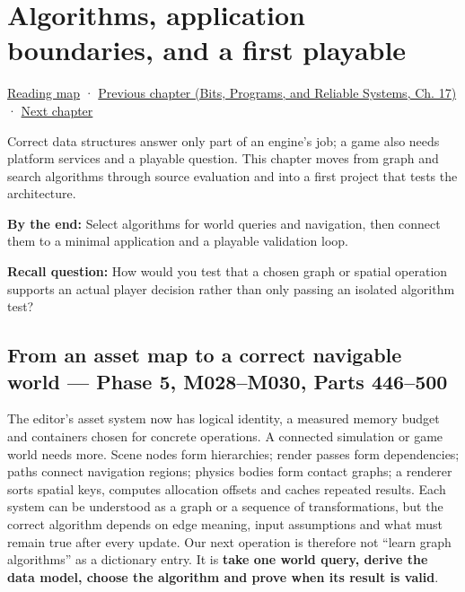 \chapter{Algorithms, application boundaries, and a first playable}\label{05-engine-i-ch008-algorithms-application-boundaries-and-a-first-playable}\hypertarget{05-engine-i-ch008}{}\label{stagechapter:05-engine-i-ch008}

\hyperref[volume-reading-map]{Reading map} · \href{../01-Bits-Programs-and-Reliable-Systems/main.pdf\#nameddest=05-engine-i-ch007-typed-apis-and-measured-cpu-data-structures}{Previous chapter (Bits, Programs, and Reliable Systems, Ch. 17)} · \hyperref[05-engine-i-ch009-player-choices-rules-and-readable-feedback]{Next chapter}

Correct data structures answer only part of an engine's job; a game also needs platform services and a playable question. This chapter moves from graph and search algorithms through source evaluation and into a first project that tests the architecture.

\textbf{By the end:} Select algorithms for world queries and navigation, then connect them to a minimal application and a playable validation loop.

\textbf{Recall question:} How would you test that a chosen graph or spatial operation supports an actual player decision rather than only passing an isolated algorithm test?

\section{From an asset map to a correct navigable world --- Phase 5, M028--M030, Parts 446--500}\label{05-engine-i-ch008-from-an-asset-map-to-a-correct-navigable-world-phase-5-m028m030-parts-446500}

The editor's asset system now has logical identity, a measured memory budget and containers chosen for concrete operations. A connected simulation or game world needs more. Scene nodes form hierarchies; render passes form dependencies; paths connect navigation regions; physics bodies form contact graphs; a renderer sorts spatial keys, computes allocation offsets and caches repeated results. Each system can be understood as a graph or a sequence of transformations, but the correct algorithm depends on edge meaning, input assumptions and what must remain true after every update. Our next operation is therefore not ``learn graph algorithms'' as a dictionary entry. It is \textbf{take one world query, derive the data model, choose the algorithm and prove when its result is valid}.

